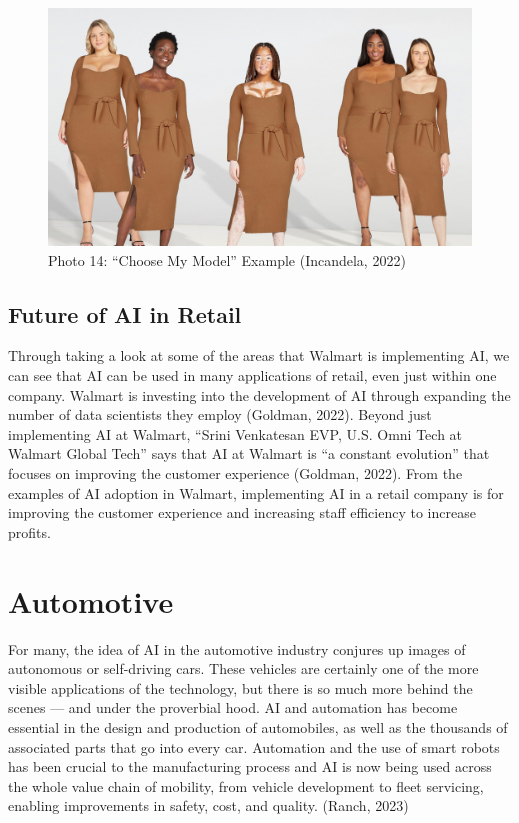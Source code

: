 \documentclass[
]{article}
\begin{document}
\begin{figure}
\centering
\includegraphics{ChooseMyModel.jpg}
\caption{Photo 14: ``Choose My Model'' Example (Incandela, 2022)}
\end{figure}

\hypertarget{future-of-ai-in-retail}{%
\subsection{Future of AI in Retail}\label{future-of-ai-in-retail}}

Through taking a look at some of the areas that Walmart is implementing AI, we can see that AI can be used in many applications of retail, even just within one company. Walmart is investing into the development of AI through expanding the number of data scientists they employ (Goldman, 2022). Beyond just implementing AI at Walmart, ``Srini Venkatesan EVP, U.S. Omni Tech at Walmart Global Tech'' says that AI at Walmart is ``a constant evolution'' that focuses on improving the customer experience (Goldman, 2022). From the examples of AI adoption in Walmart, implementing AI in a retail company is for improving the customer experience and increasing staff efficiency to increase profits.

\hypertarget{automotive}{%
\section{Automotive}\label{automotive}}

For many, the idea of AI in the automotive industry conjures up images of autonomous or self-driving cars. These vehicles are certainly one of the more visible applications of the technology, but there is so much more behind the scenes --- and under the proverbial hood. AI and automation has become essential in the design and production of automobiles, as well as the thousands of associated parts that go into every car. Automation and the use of smart robots has been crucial to the manufacturing process and AI is now being used across the whole value chain of mobility, from vehicle development to fleet servicing, enabling improvements in safety, cost, and quality. (Ranch, 2023)
\end{document}
